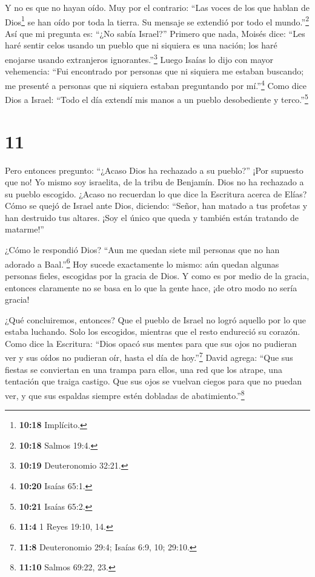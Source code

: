  Y no es que no hayan oído. Muy por el contrario: ``Las
voces de los que hablan de Dios\footnote{\textbf{10:18} Implícito.} se
han oído por toda la tierra. Su mensaje se extendió por todo el
mundo.''\footnote{\textbf{10:18} Salmos 19:4.}  Así que mi
pregunta es: ``¿No sabía Israel?'' Primero que nada, Moisés dice: ``Les
haré sentir celos usando un pueblo que ni siquiera es una nación; los
haré enojarse usando extranjeros ignorantes.''\footnote{\textbf{10:19}
  Deuteronomio 32:21.}  Luego Isaías lo dijo con mayor
vehemencia: ``Fui encontrado por personas que ni siquiera me estaban
buscando; me presenté a personas que ni siquiera estaban preguntando por
mí.''\footnote{\textbf{10:20} Isaías 65:1.}  Como dice Dios
a Israel: ``Todo el día extendí mis manos a un pueblo desobediente y
terco.''\footnote{\textbf{10:21} Isaías 65:2.}

\hypertarget{section-10}{%
\section{11}\label{section-10}}

 Pero entonces pregunto: ``¿Acaso Dios ha rechazado a su
pueblo?'' ¡Por supuesto que no! Yo mismo soy israelita, de la tribu de
Benjamín.  Dios no ha rechazado a su pueblo escogido. ¿Acaso
no recuerdan lo que dice la Escritura acerca de Elías? Cómo se quejó de
Israel ante Dios, diciendo:  ``Señor, han matado a tus
profetas y han destruido tus altares. ¡Soy el único que queda y también
están tratando de matarme!''

 ¿Cómo le respondió Dios? ``Aun me quedan siete mil personas
que no han adorado a Baal.''\footnote{\textbf{11:4} 1 Reyes 19:10, 14.}
 Hoy sucede exactamente lo mismo: aún quedan algunas
personas fieles, escogidas por la gracia de Dios.  Y como es
por medio de la gracia, entonces claramente no se basa en lo que la
gente hace, ¡de otro modo no sería gracia!

 ¿Qué concluiremos, entonces? Que el pueblo de Israel no
logró aquello por lo que estaba luchando. Solo los escogidos, mientras
que el resto endureció su corazón.  Como dice la Escritura:
``Dios opacó sus mentes para que sus ojos no pudieran ver y sus oídos no
pudieran oír, hasta el día de hoy.''\footnote{\textbf{11:8} Deuteronomio
  29:4; Isaías 6:9, 10; 29:10.}  David agrega: ``Que sus
fiestas se conviertan en una trampa para ellos, una red que los atrape,
una tentación que traiga castigo.  Que sus ojos se vuelvan
ciegos para que no puedan ver, y que sus espaldas siempre estén dobladas
de abatimiento.''\footnote{\textbf{11:10} Salmos 69:22, 23.}

